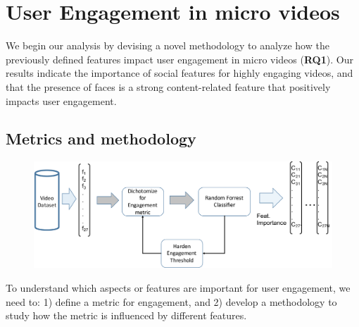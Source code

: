 \section{User Engagement in micro videos}
\label{sec:classifier}
We begin our analysis by devising a novel 
methodology to analyze how the previously defined features impact user engagement in micro videos (\textbf{RQ1}). Our results indicate the importance of social features for highly engaging videos, and that the presence of faces is a strong content-related feature that positively impacts user engagement.

\subsection{Metrics and methodology}
\label{sec:methodology}

\begin{figure}[htp]
    \centering
        \includegraphics[width=\textwidth]{pipeline.pdf}        \label{fig:pipeline}
\end{figure}


To understand which aspects or features are important for user engagement, we need to: 1) define a metric for engagement, and 2) develop a methodology to study how the metric is influenced by different features. 

